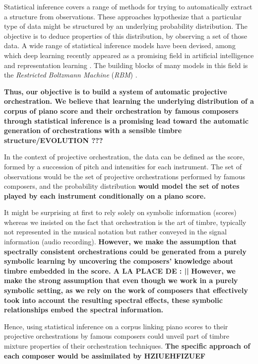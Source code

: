 \documentclass[letterpaper]{article}
\begin{document}
Statistical inference covers a range of methods for trying to automatically extract a structure from observations. These approaches hypothesize that a particular type of data might be structured by an underlying probability distribution. The objective is to deduce properties of this distribution, by observing a set of those data. A wide range of statistical inference models have been devised, among which deep learning recently appeared as a  promising field in artificial intelligence and representation learning \cite{bengio2013representation,LeCun:2015aa}. The building blocks of many models in this field is the \textit{Restricted Boltzmann Machine} (\textit{RBM}) \cite{hinton2006fast}. 


\textbf{Thus, our objective is to build a system of automatic projective orchestration. We believe that learning the underlying distribution of a corpus of piano score and their orchestration by famous composers through statistical inference is a promising lead toward the automatic generation of orchestrations with a sensible timbre structure/EVOLUTION ???}

In the context of projective orchestration, the data can be defined as the score, formed by a succession of pitch and intensities for each instrument. The set of observations would be the set of projective orchestrations performed by famous composers, and the probability distribution \textbf{would model the set of notes played by each instrument conditionally on a piano score.}

It might be surprising at first to rely solely on symbolic information (scores) whereas we insisted on the fact that orchestration is the art of timbre, typically not represented in the musical notation but rather conveyed in the signal information (audio recording). 
\textbf{However, we make the assumption that spectrally consistent orchestrations could be generated from a purely symbolic learning by uncovering the \textbf{composers' knowledge about timbre embedded in the score.} A LA PLACE DE : ||}
\textbf{However, we make the strong assumption that even though we work in a purely symbolic setting, as we rely on the work of composers that effectively took into account the resulting spectral effects, these symbolic relationships embed the spectral information.}

Hence, using statistical inference on a corpus linking piano scores to their projective orchestrations by famous composers could unveil part of timbre mixture properties of their orchestration techniques. \textbf{The specific approach of each composer would be assimilated by HZIUEHFIZUEF}
\end{document}

